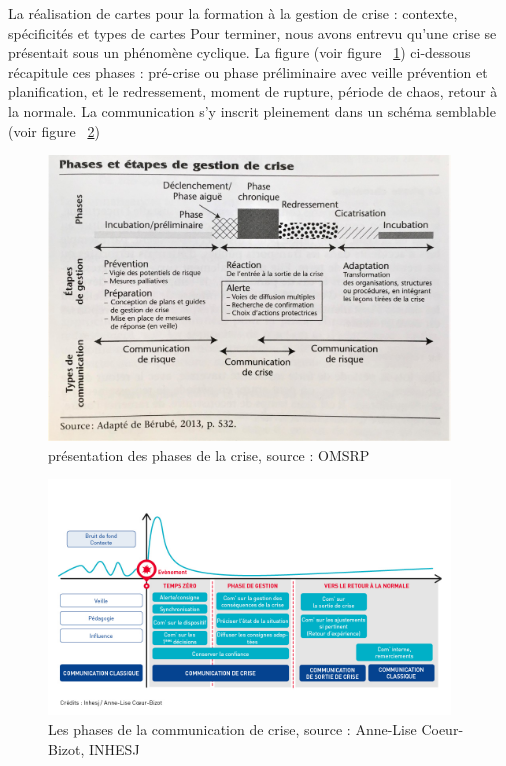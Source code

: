 \documentclass[10pt,a4paper]{report} %
\begin{document}
\begin{part}{La réalisation de cartes pour la formation à la gestion de crise : contexte, spécificités et types de cartes}
Pour terminer, nous avons entrevu qu’une crise se présentait sous un phénomène cyclique. La figure (voir figure ~\ref{fig4}) ci-dessous récapitule ces phases : pré-crise ou phase préliminaire avec veille prévention et planification, et le redressement, moment de rupture, période de chaos, retour à la normale. La communication s’y inscrit pleinement dans un schéma semblable (voir figure ~\ref{fig5})
\begin{figure}[!t]
    \centering
    \includegraphics[width=0.95\textwidth]{figures/phasescrise.jpg}
    \caption{présentation des phases de la crise, source : OMSRP}
    \label{fig4}
\end{figure}

\begin{figure}[!t]
    \centering
    \includegraphics[width=0.95\textwidth]{figures/tempszero_crise.jpg}
    \caption{Les phases de la communication de crise, source : Anne-Lise Coeur-Bizot, INHESJ}
    \label{fig5}
\end{figure}


\end{part}
\end{document}
